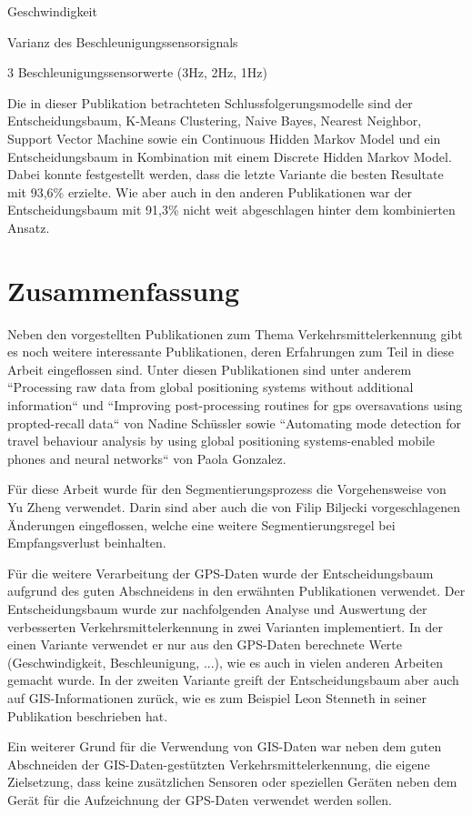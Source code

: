 \begin{pitemize}
\item Geschwindigkeit
\item Varianz des Beschleunigungssensorsignals
\item 3 Beschleunigungssensorwerte (3Hz, 2Hz, 1Hz)
\end{pitemize}

Die in dieser Publikation betrachteten Schlussfolgerungsmodelle sind der Entscheidungsbaum, K-Means Clustering, Naive Bayes, Nearest Neighbor, Support Vector Machine sowie ein Continuous Hidden Markov Model und ein Entscheidungsbaum in Kombination mit einem Discrete Hidden Markov Model. Dabei konnte festgestellt werden, dass die letzte Variante die besten Resultate mit 93,6\% erzielte. Wie aber auch in den anderen Publikationen war der Entscheidungsbaum mit 91,3\% nicht weit abgeschlagen hinter dem kombinierten Ansatz.

\section{Zusammenfassung}

Neben den vorgestellten Publikationen zum Thema Verkehrsmittelerkennung gibt es noch weitere interessante Publikationen, deren Erfahrungen zum Teil in diese Arbeit eingeflossen sind. Unter diesen Publikationen sind unter anderem ``Processing raw data from global positioning systems without additional information`` \cite{schuessler_processing_2009}  und  ``Improving post-processing routines for gps oversavations using propted-recall data`` \cite{nadine_schussler_improving_2011} von Nadine Schüssler sowie ``Automating mode detection for travel behaviour analysis by using global positioning systems-enabled mobile phones and neural networks`` \cite{gonzalez_automating_2010} von Paola Gonzalez.

Für diese Arbeit wurde für den Segmentierungsprozess die Vorgehensweise von Yu Zheng \cite{zheng_understanding_2010} verwendet. Darin sind aber auch die von Filip Biljecki \cite{biljecki_transportation_2013} vorgeschlagenen Änderungen eingeflossen, welche eine weitere Segmentierungsregel bei Empfangsverlust beinhalten. 

Für die weitere Verarbeitung der GPS-Daten wurde der Entscheidungsbaum aufgrund des guten Abschneidens in den erwähnten Publikationen verwendet. Der Entscheidungsbaum wurde zur nachfolgenden Analyse und Auswertung der verbesserten Verkehrsmittelerkennung in zwei Varianten implementiert. In der einen Variante verwendet er nur aus den GPS-Daten berechnete Werte (Geschwindigkeit, Beschleunigung, ...), wie es auch in vielen anderen Arbeiten gemacht wurde. In der zweiten Variante greift der Entscheidungsbaum aber auch auf GIS-Informationen zurück, wie es zum Beispiel Leon Stenneth in seiner Publikation  \cite{stenneth_transportation_2011} beschrieben hat.

Ein weiterer Grund für die Verwendung von GIS-Daten war neben dem guten Abschneiden der GIS-Daten-gestützten Verkehrsmittelerkennung, die eigene Zielsetzung, dass keine zusätzlichen Sensoren oder speziellen Geräten neben dem Gerät für die Aufzeichnung der GPS-Daten verwendet werden sollen.

